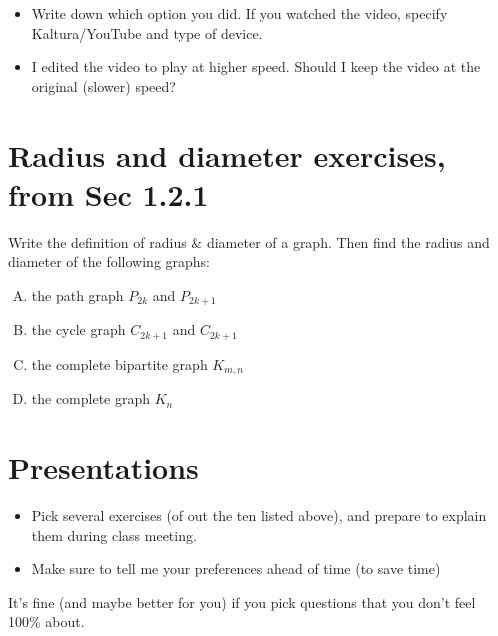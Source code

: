 \documentclass[11pt]{amsart}
\begin{document}
\begin{itemize}
	\item 
	Write down which option you did. If you watched the video, specify Kaltura/YouTube and type of device.
	
	\item 
	I edited the video to play at higher speed. Should I keep the video at the original (slower) speed?  
\end{itemize}






\section{Radius and diameter exercises, from Sec 1.2.1}
Write the definition of radius \& diameter of a graph. 
Then find the radius and diameter of the following graphs: 
\begin{enumerate}[A.]
\item 
the path graph $P_{2k}$ and 
 $P_{2k+1}$
\item 
the cycle graph $C_{2k+1}$ and $C_{2k+1}$
\item 
the complete bipartite graph $K_{m,n}$
\item  
the complete graph $K_{n}$
\end{enumerate}

\section{Presentations}
\begin{itemize}
\item Pick several exercises (of out the ten listed above), and prepare to explain them during class meeting.
\item Make sure to tell me your preferences ahead of time (to save time)
\end{itemize}

It's fine (and maybe better for you) if you pick questions that you don't feel 100\% about.
\end{document}
